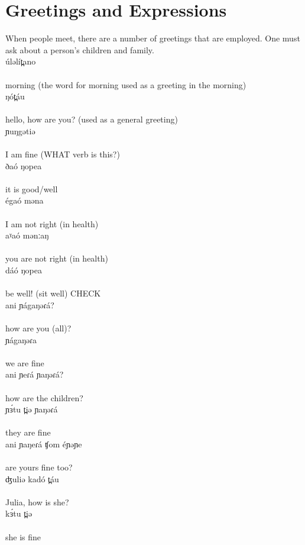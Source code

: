 \chapter{Greetings and Expressions}

When people meet, there are a number of greetings that are employed. One must ask about a person’s children and family.
\\
\gll úləlít̪ano\\
\\
	\trans	morning	(the word for morning used as a greeting in the morning)\\
\gll ŋót̪áu		\\
	\\
	\trans		hello, how are you?	(used as a general greeting)\\
\gll ɲuŋgətiə		\\
	\\
	\trans		I am fine	(WHAT verb is this?)\\
\gll ðaó ŋopea		\\
	\\
	\trans		it is good/well\\
\gll égaó məna		\\
	\\
	\trans		I am not right (in health)\\
\gll aˠaó mənːaŋ		\\
	\\
	\trans		 you are not right (in health)\\
\gll dáó ŋopea		\\
	\\
	\trans		be well! (sit well)		CHECK\\
\gll ani ɲágaŋəɾá?	\\
	\\
	\trans			how are you (all)?\\
\gll ɲágaŋəɾa		\\
	\\
	\trans		we are fine\\
\gll ani ɲeɾá ɲaŋəɾá?\\
	\\
	\trans		how are the children?\\
\gll ɲɜ́tu t̪iə ɲaŋəɾá	\\
	\\
	\trans		they are fine\\
\gll ani ɲaŋeɾá ʧom éɲəɲe\\
	\\
	\trans	are yours fine too?\\
\gll ʤuliə kadó t̪áu	\\
	\\
	\trans		Julia, how is she? \\
\gll kɜ́tu t̪iə		\\
	\\
	\trans		she is fine\\


